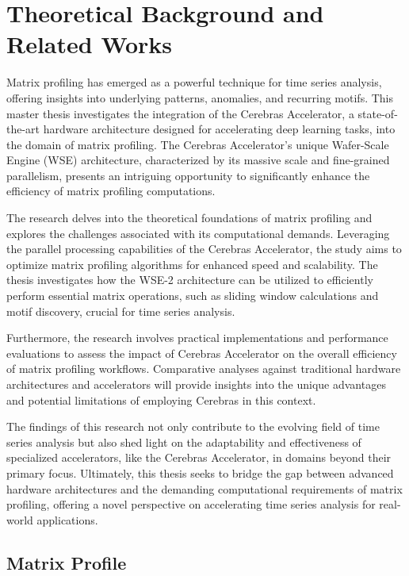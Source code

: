 \chapter{Theoretical Background and Related Works} \label{chapter:theoretical_background}

Matrix profiling has emerged as a powerful technique for time series analysis, offering insights into underlying patterns, anomalies, and recurring motifs. This master thesis investigates the integration of the Cerebras Accelerator, a state-of-the-art hardware architecture designed for accelerating deep learning tasks, into the domain of matrix profiling. The Cerebras Accelerator's unique Wafer-Scale Engine (WSE) architecture, characterized by its massive scale and fine-grained parallelism, presents an intriguing opportunity to significantly enhance the efficiency of matrix profiling computations.

The research delves into the theoretical foundations of matrix profiling and explores the challenges associated with its computational demands. Leveraging the parallel processing capabilities of the Cerebras Accelerator, the study aims to optimize matrix profiling algorithms for enhanced speed and scalability. The thesis investigates how the WSE-2 architecture can be utilized to efficiently perform essential matrix operations, such as sliding window calculations and motif discovery, crucial for time series analysis.

Furthermore, the research involves practical implementations and performance evaluations to assess the impact of Cerebras Accelerator on the overall efficiency of matrix profiling workflows. Comparative analyses against traditional hardware architectures and accelerators will provide insights into the unique advantages and potential limitations of employing Cerebras in this context.

The findings of this research not only contribute to the evolving field of time series analysis but also shed light on the adaptability and effectiveness of specialized accelerators, like the Cerebras Accelerator, in domains beyond their primary focus. Ultimately, this thesis seeks to bridge the gap between advanced hardware architectures and the demanding computational requirements of matrix profiling, offering a novel perspective on accelerating time series analysis for real-world applications.

\section{Matrix Profile} \label{section:matrix_profile}

